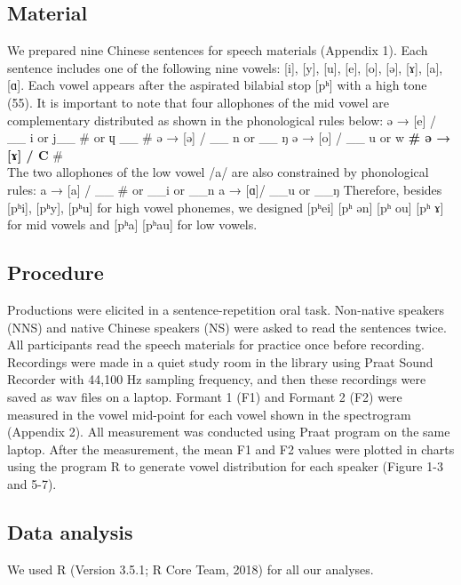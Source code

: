 \documentclass[man, fleqn, noextraspace]{apa6}
\begin{document}
\subsection{Material}\label{material}

We prepared nine Chinese sentences for speech materials (Appendix 1).
Each sentence includes one of the following nine vowels: {[}i{]},
{[}y{]}, {[}u{]}, {[}e{]}, {[}o{]}, {[}ə{]}, {[}ɤ{]}, {[}a{]}, {[}ɑ{]}.
Each vowel appears after the aspirated bilabial stop {[}pʰ{]} with a
high tone (55). It is important to note that four allophones of the mid
vowel are complementary distributed as shown in the phonological rules
below: ə → {[}e{]} / \_\_ i or j\_\_ \# or ɥ \_\_ \# ə → {[}ə{]} / \_\_
n or \_\_ ŋ ə → {[}o{]} / \_\_ u or w \textbf{\# ə → {[}ɤ{]} / C } \#\\
The two allophones of the low vowel /a/ are also constrained by
phonological rules: a → {[}a{]} / \_\_ \# or \_\_i or \_\_n a → {[}ɑ{]}/
\_\_u or \_\_ŋ Therefore, besides {[}pʰi{]}, {[}pʰy{]}, {[}pʰu{]} for
high vowel phonemes, we designed {[}pʰei{]} {[}pʰ ən{]} {[}pʰ ou{]}
{[}pʰ ɤ{]} for mid vowels and {[}pʰa{]} {[}pʰau{]} for low vowels.

\subsection{Procedure}\label{procedure}

Productions were elicited in a sentence-repetition oral task. Non-native
speakers (NNS) and native Chinese speakers (NS) were asked to read the
sentences twice. All participants read the speech materials for practice
once before recording. Recordings were made in a quiet study room in the
library using Praat Sound Recorder with 44,100 Hz sampling frequency,
and then these recordings were saved as wav files on a laptop. Formant 1
(F1) and Formant 2 (F2) were measured in the vowel mid-point for each
vowel shown in the spectrogram (Appendix 2). All measurement was
conducted using Praat program on the same laptop. After the measurement,
the mean F1 and F2 values were plotted in charts using the program R to
generate vowel distribution for each speaker (Figure 1-3 and 5-7).

\subsection{Data analysis}\label{data-analysis}

We used R (Version 3.5.1; R Core Team, 2018) for all our analyses.
\end{document}

